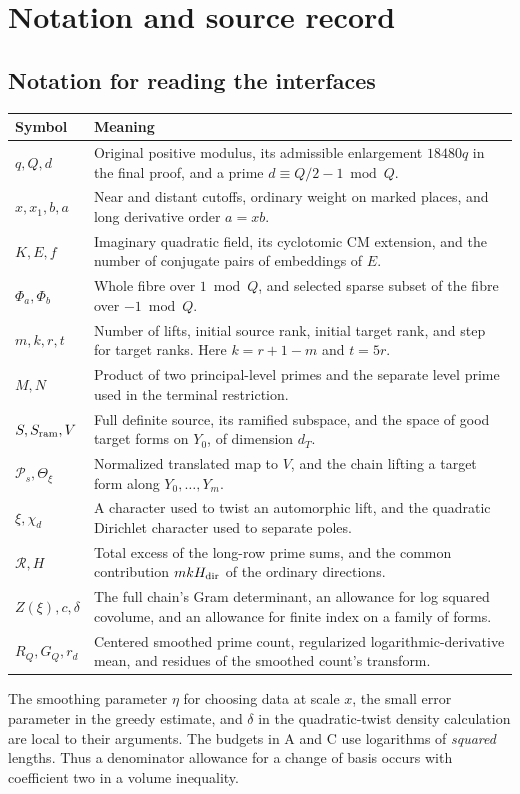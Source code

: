 \section{Notation and source record}\label{sec:record}
\subsection{Notation for reading the interfaces}
\begin{center}\small
\renewcommand{\arraystretch}{1.18}
\begin{tabularx}{.98\linewidth}{@{}p{.18\linewidth}X@{}}
\toprule
Symbol & Meaning\\ \midrule
\(q,Q,d\) & Original positive modulus, its admissible enlargement \(18480q\) in the final proof, and a prime \(d\equiv Q/2-1\bmod Q\).\\
\(x,x_1,b,a\) & Near and distant cutoffs, ordinary weight on marked places, and long derivative order \(a=xb\).\\
\(K,E,f\) & Imaginary quadratic field, its cyclotomic CM extension, and the number of conjugate pairs of embeddings of \(E\).\\
\(\Phi_a,\Phi_b\) & Whole fibre over \(1\bmod Q\), and selected sparse subset of the fibre over \(-1\bmod Q\).\\
\(m,k,r,t\) & Number of lifts, initial source rank, initial target rank, and step for target ranks. Here \(k=r+1-m\) and \(t=5r\).\\
\(M,N\) & Product of two principal-level primes and the separate level prime used in the terminal restriction.\\
\(S,S_{\rm ram},V\) & Full definite source, its ramified subspace, and the space of good target forms on \(Y_0\), of dimension \(d_T\).\\
\(\mathcal P_s,\Theta_\xi\) & Normalized translated map to \(V\), and the chain lifting a target form along \(Y_0,\ldots,Y_m\).\\
\(\xi,\chi_d\) & A character used to twist an automorphic lift, and the quadratic Dirichlet character used to separate poles.\\
\(\mathcal R,H\) & Total excess of the long-row prime sums, and the common contribution \(mkH_{\rm dir}\) of the ordinary directions.\\
\(Z(\xi),c,\delta\) & The full chain's Gram determinant, an allowance for log squared covolume, and an allowance for finite index on a family of forms.\\
\(R_Q,G_Q,r_d\) & Centered smoothed prime count, regularized logarithmic-derivative mean, and residues of the smoothed count's transform.\\
\bottomrule
\end{tabularx}
\end{center}
The smoothing parameter \(\eta\) for choosing data at scale \(x\), the small error parameter in the greedy estimate, and \(\delta\) in the quadratic-twist density calculation are local to their arguments. The budgets in A and C use logarithms of \emph{squared} lengths. Thus a denominator allowance for a change of basis occurs with coefficient two in a volume inequality.

